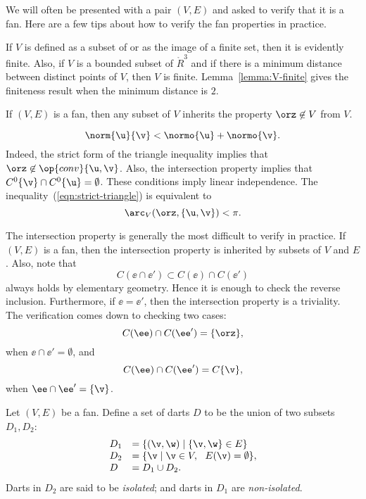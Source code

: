 \begin{remark}\label{remark:fan-verify}  
We will often be presented with a pair $(V,E)$ and asked to verify that it is a fan.  Here are a few tips about how to verify the fan properties in practice.
\begin{nomerate} 
\item {}  If $V$ is defined as a subset of or as the image of a finite set, then it is evidently finite.   Also, if $V$ is a bounded subset of $\ring{R}^3$ and if there is a minimum distance between distinct points of $V$, then $V$ is finite.  Lemma~\ref{lemma:V-finite} gives the finiteness result when the minimum distance is $2$.\vspace{6pt}
\item {}  If $(V,E)$ is a fan, then any subset of $V$ inherits the property $\orz\not\in V$ from $V$.  \vspace{6pt}
\item {} 
\begin{equation}\label{eqn:strict-triangle}
\norm{\u}{\v} < \normo{\u} + \normo{\v}.
\end{equation}
Indeed, the strict form of the triangle inequality implies that $\orz\not\in \op{conv}\{\u,\v\}$.  Also,
 the intersection property implies 
 that $C^0\{\v\} \cap C^0\{\u\} = \emptyset$.  These conditions imply linear independence.
The inequality~(\ref{eqn:strict-triangle}) is equivalent to
$$
\arc_V(\orz,\{\u,\v\}) < \pi.
$$
\item {} The intersection property is generally the most difficult to verify in practice.  If $(V,E)$ is a fan, then the intersection property is inherited by subsets of $V$ and $E$.  Also, note  that
$$
C(\ee\cap \ee') \subset C(\ee) \cap C(\ee')
$$
always holds by elementary geometry.  Hence it is enough to check the reverse inclusion.  Furthermore, if $\ee = \ee'$, then the intersection property is a triviality.  The verification comes down to checking two cases:
$$
C(\ee) \cap C(\ee') = \{\orz\},
$$
when $\ee\cap \ee' = \emptyset$, and
$$
C(\ee)\cap C(\ee') = C\{\v\},
$$
when $\ee\cap \ee' = \{\v\}$.
\end{nomerate}
\end{remark}


Let $(V,E)$ be a fan.  Define a set of darts $D$ to be the union of
two subsets $D_1,D_2$:
    $$
    \begin{array}{lll}
    D_1 &= \{(\v,\w)\mid \{\v,\w\}\in E\}\\
    D_2 &= \{\v \mid \v\in V,\ \ E(\v) = \emptyset\},\\
    D   &= D_1\cup D_2.
    \end{array}
    $$
Darts in $D_2$ are said to be {\it isolated}; and darts in $D_1$ are {\it non-isolated}.
%
%
%
%
%
%
%

